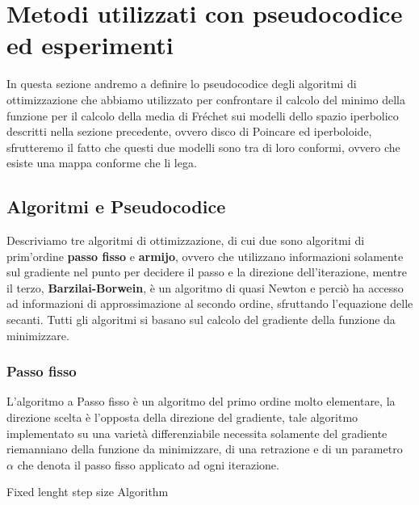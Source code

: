 \documentclass[a4paper, 12pt]{article}
\begin{document}
\section{Metodi utilizzati con pseudocodice ed esperimenti}
In questa sezione andremo a definire lo pseudocodice degli algoritmi di ottimizzazione che abbiamo utilizzato per confrontare il calcolo del minimo della funzione per il calcolo della media di Fréchet sui modelli dello spazio iperbolico descritti nella sezione precedente, ovvero disco di Poincare ed iperboloide, sfrutteremo il fatto che questi due modelli sono tra di loro conformi, ovvero che esiste una mappa conforme che li lega.
\subsection{Algoritmi e Pseudocodice}
Descriviamo tre algoritmi di ottimizzazione, di cui due sono algoritmi di prim'ordine \textbf{passo fisso} e \textbf{armijo}, ovvero che utilizzano informazioni solamente sul gradiente nel punto per decidere il passo e la direzione dell'iterazione, mentre il terzo, \textbf{Barzilai-Borwein}, è un algoritmo di quasi Newton e perciò ha accesso ad informazioni di approssimazione al secondo ordine, sfruttando l'equazione delle secanti. Tutti gli algoritmi si basano sul calcolo del gradiente della funzione da minimizzare.
\subsubsection{Passo fisso}
L'algoritmo a Passo fisso è un algoritmo del primo ordine molto elementare, la direzione scelta è l'opposta della direzione del gradiente, tale algoritmo implementato su una varietà differenziabile necessita solamente del gradiente riemanniano della funzione da minimizzare, di una retrazione e di un parametro $\alpha$ che denota il passo fisso applicato ad ogni iterazione.\\
\begin{center}
\begin{algorithm}[H]
\SetAlgoLined
{}
\caption{Fixed lenght step size Algorithm}
\end{algorithm}
\end{center}
\end{document}
